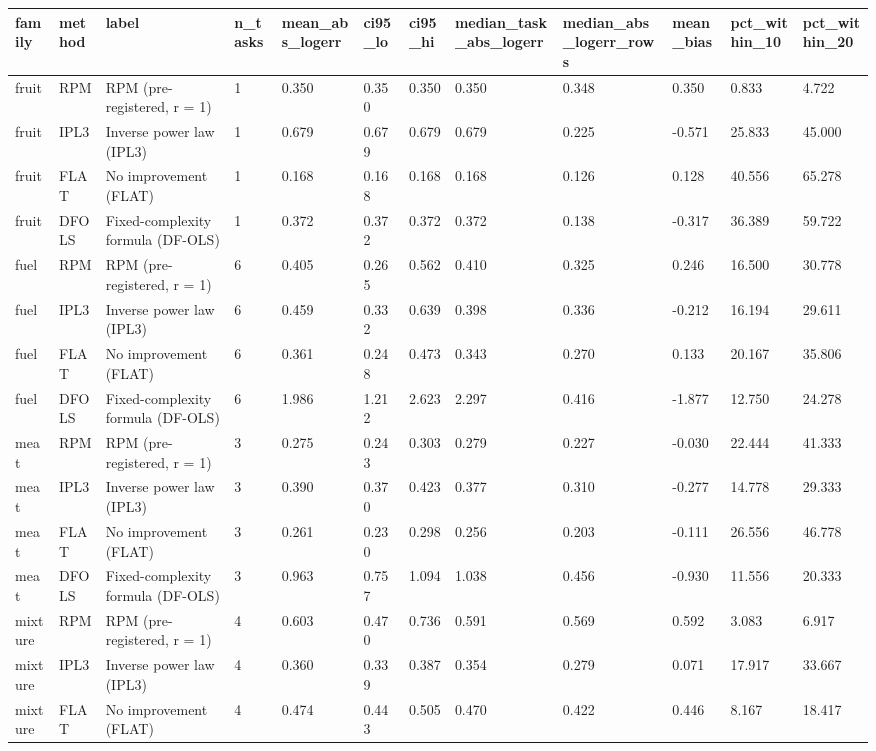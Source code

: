 \begin{tabular}{llllllllllll}
\hline
family & method & label & n\_tasks & mean\_abs\_logerr & ci95\_lo & ci95\_hi & median\_task\_abs\_logerr & median\_abs\_logerr\_rows & mean\_bias & pct\_within\_10 & pct\_within\_20 \\
\hline
fruit & RPM & RPM (pre-registered, r = 1) & 1 & 0.350 & 0.350 & 0.350 & 0.350 & 0.348 & 0.350 & 0.833 & 4.722 \\
fruit & IPL3 & Inverse power law (IPL3) & 1 & 0.679 & 0.679 & 0.679 & 0.679 & 0.225 & -0.571 & 25.833 & 45.000 \\
fruit & FLAT & No improvement (FLAT) & 1 & 0.168 & 0.168 & 0.168 & 0.168 & 0.126 & 0.128 & 40.556 & 65.278 \\
fruit & DFOLS & Fixed-complexity formula (DF-OLS) & 1 & 0.372 & 0.372 & 0.372 & 0.372 & 0.138 & -0.317 & 36.389 & 59.722 \\
fuel & RPM & RPM (pre-registered, r = 1) & 6 & 0.405 & 0.265 & 0.562 & 0.410 & 0.325 & 0.246 & 16.500 & 30.778 \\
fuel & IPL3 & Inverse power law (IPL3) & 6 & 0.459 & 0.332 & 0.639 & 0.398 & 0.336 & -0.212 & 16.194 & 29.611 \\
fuel & FLAT & No improvement (FLAT) & 6 & 0.361 & 0.248 & 0.473 & 0.343 & 0.270 & 0.133 & 20.167 & 35.806 \\
fuel & DFOLS & Fixed-complexity formula (DF-OLS) & 6 & 1.986 & 1.212 & 2.623 & 2.297 & 0.416 & -1.877 & 12.750 & 24.278 \\
meat & RPM & RPM (pre-registered, r = 1) & 3 & 0.275 & 0.243 & 0.303 & 0.279 & 0.227 & -0.030 & 22.444 & 41.333 \\
meat & IPL3 & Inverse power law (IPL3) & 3 & 0.390 & 0.370 & 0.423 & 0.377 & 0.310 & -0.277 & 14.778 & 29.333 \\
meat & FLAT & No improvement (FLAT) & 3 & 0.261 & 0.230 & 0.298 & 0.256 & 0.203 & -0.111 & 26.556 & 46.778 \\
meat & DFOLS & Fixed-complexity formula (DF-OLS) & 3 & 0.963 & 0.757 & 1.094 & 1.038 & 0.456 & -0.930 & 11.556 & 20.333 \\
mixture & RPM & RPM (pre-registered, r = 1) & 4 & 0.603 & 0.470 & 0.736 & 0.591 & 0.569 & 0.592 & 3.083 & 6.917 \\
mixture & IPL3 & Inverse power law (IPL3) & 4 & 0.360 & 0.339 & 0.387 & 0.354 & 0.279 & 0.071 & 17.917 & 33.667 \\
mixture & FLAT & No improvement (FLAT) & 4 & 0.474 & 0.443 & 0.505 & 0.470 & 0.422 & 0.446 & 8.167 & 18.417 \\

\end{tabular}
